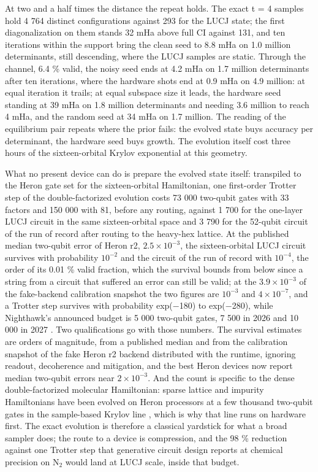 \documentclass[11pt]{article}
\begin{document}
At two and a half times the distance the repeat holds. The exact t = 4 samples hold 4 764 distinct configurations against 293 for the LUCJ state; the first diagonalization on them stands 32 mHa above full CI against 131, and ten iterations within the support bring the clean seed to 8.8 mHa on 1.0 million determinants, still descending, where the LUCJ samples are static. Through the channel, 6.4 \% valid, the noisy seed ends at 4.2 mHa on 1.7 million determinants after ten iterations, where the hardware shots end at 0.9 mHa on 4.9 million: at equal iteration it trails; at equal subspace size it leads, the hardware seed standing at 39 mHa on 1.8 million determinants and needing 3.6 million to reach 4 mHa, and the random seed at 34 mHa on 1.7 million. The reading of the equilibrium pair repeats where the prior fails: the evolved state buys accuracy per determinant, the hardware seed buys growth. The evolution itself cost three hours of the sixteen-orbital Krylov exponential at this geometry.

What no present device can do is prepare the evolved state itself: transpiled to the Heron gate set for the sixteen-orbital Hamiltonian, one first-order Trotter step of the double-factorized evolution costs 73 000 two-qubit gates with 33 factors and 150 000 with 81, before any routing, against 1 700 for the one-layer LUCJ circuit in the same sixteen-orbital space and 3 790 for the 52-qubit circuit of the run of record after routing to the heavy-hex lattice. At the published median two-qubit error of Heron r2, $2.5\times10^{-3}$, the sixteen-orbital LUCJ circuit survives with probability $10^{-2}$ and the circuit of the run of record with $10^{-4}$, the order of its 0.01 \% valid fraction, which the survival bounds from below since a string from a circuit that suffered an error can still be valid; at the $3.9\times10^{-3}$ of the fake-backend calibration snapshot the two figures are $10^{-3}$ and $4\times10^{-7}$, and a Trotter step survives with probability exp($-$180) to exp($-$280), while Nighthawk's announced budget is 5 000 two-qubit gates, 7 500 in 2026 and 10 000 in 2027 \cite{IBMNighthawk2025}. Two qualifications go with those numbers. The survival estimates are orders of magnitude, from a published median and from the calibration snapshot of the fake Heron r2 backend distributed with the runtime, ignoring readout, decoherence and mitigation, and the best Heron devices now report median two-qubit errors near $2\times10^{-3}$. And the count is specific to the dense double-factorized molecular Hamiltonian: sparse lattice and impurity Hamiltonians have been evolved on Heron processors at a few thousand two-qubit gates in the sample-based Krylov line \cite{Yu2025}, which is why that line runs on hardware first. The exact evolution is therefore a classical yardstick for what a broad sampler does; the route to a device is compression, and the 98 \% reduction against one Trotter step that generative circuit design reports at chemical precision on N$_2$ \cite{Kemmoku2026} would land at LUCJ scale, inside that budget.
\end{document}
